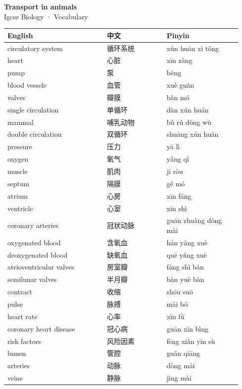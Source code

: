 \documentclass[11pt]{article}
\begin{document}
\begin{center}
  {\LARGE\bfseries Transport in animals}\\[0.35em]
  {\large Igcse Biology · Vocabulary}
\end{center}
\vspace{0.6em}

\begin{longtable}{@{}p{0.40\linewidth}p{0.24\linewidth}p{0.30\linewidth}@{}}
\toprule
\textbf{English} & \textbf{中文} & \textbf{Pinyin} \\
\midrule
\endhead
\bottomrule
\endlastfoot
circulatory system & 循环系统 & xún huán xì tǒng \\
heart & 心脏 & xīn zàng \\
pump & 泵 & bèng \\
blood vessels & 血管 & xuè guǎn \\
valves & 瓣膜 & bàn mó \\
single circulation & 单循环 & dān xún huán \\
mammal & 哺乳动物 & bǔ rǔ dòng wù \\
double circulation & 双循环 & shuāng xún huán \\
pressure & 压力 & yā lì \\
oxygen & 氧气 & yǎng qì \\
muscle & 肌肉 & jī ròu \\
septum & 隔膜 & gé mó \\
atrium & 心房 & xīn fáng \\
ventricle & 心室 & xīn shì \\
coronary arteries & 冠状动脉 & guān zhuàng dòng mài \\
oxygenated blood & 含氧血 & hán yǎng xuè \\
deoxygenated blood & 缺氧血 & quē yǎng xuè \\
atrioventricular valves & 房室瓣 & fáng shì bàn \\
semilunar valves & 半月瓣 & bàn yuè bàn \\
contract & 收缩 & shōu suō \\
pulse & 脉搏 & mài bó \\
heart rate & 心率 & xīn lǜ \\
coronary heart disease & 冠心病 & guān xīn bìng \\
risk factors & 风险因素 & fēng xiǎn yīn sù \\
lumen & 管腔 & guǎn qiāng \\
arteries & 动脉 & dòng mài \\
veins & 静脉 & jìng mài \\

\end{longtable}
\end{document}
